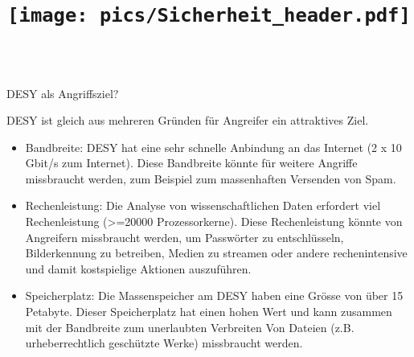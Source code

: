 \documentclass[final]{beamer}
\title{\texttt{[image: pics/Sicherheit\_header.pdf]}} %
\author{} %
\begin{document}

\setlength{\belowcaptionskip}{2ex} %
\setlength\belowdisplayshortskip{2ex} %

\begin{frame}[t] %

\begin{columns}[t]
 \begin{column}{0.95\textwidth}
  \begin{alertblock}{DESY als Angriffsziel?}
   \small{
   DESY ist gleich aus mehreren Gründen für Angreifer ein attraktives Ziel. 
   \begin{itemize}
    \item Bandbreite: DESY hat eine sehr schnelle Anbindung an das Internet 
    (2 x 10 Gbit/s zum Internet). Diese Bandbreite könnte für weitere Angriffe missbraucht 
    werden, zum Beispiel zum massenhaften Versenden von Spam.

    \item Rechenleistung: Die Analyse von wissenschaftlichen Daten erfordert 
    viel Rechenleistung (>=20000 Prozessorkerne). Diese Rechenleistung könnte von Angreifern missbraucht werden,
    um Passwörter zu entschlüsseln, Bilderkennung zu betreiben, Medien zu streamen oder 
    andere rechenintensive und damit kostspielige Aktionen auszuführen.

    \item  Speicherplatz: Die Massenspeicher am DESY haben eine Grösse von über 
    15 Petabyte. Dieser Speicherplatz hat einen hohen Wert und kann zusammen 
    mit der Bandbreite zum unerlaubten Verbreiten Von Dateien (z.B. urheberrechtlich 
    geschützte Werke) missbraucht werden.
   \end{itemize}
   }
  \end{alertblock}
 \end{column}
\end{columns}


\begin{columns}[t, totalwidth=\textwidth] %


\end{columns}
\end{frame}
\end{document}
